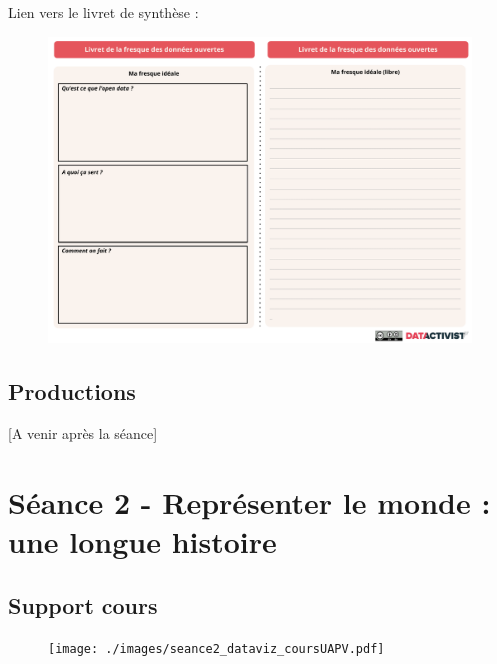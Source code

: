 \documentclass[
  letterpaper,
  DIV=11,
  numbers=noendperiod]{scrreprt}
\begin{document}
Lien vers le livret de synthèse :

\begin{figure}

{\centering \includegraphics{./images/Fresque - livret.pdf}

}

\end{figure}

\hypertarget{productions}{%
\section{Productions}\label{productions}}

{[}A venir après la séance{]}


\hypertarget{suxe9ance-2---repruxe9senter-le-monde-une-longue-histoire}{%
\chapter{Séance 2 - Représenter le monde : une longue
histoire}\label{suxe9ance-2---repruxe9senter-le-monde-une-longue-histoire}}

\hypertarget{support-cours}{%
\section{Support cours}\label{support-cours}}

\begin{figure}

{\centering \texttt{[image: ./images/seance2\_dataviz\_coursUAPV.pdf]}

}

\end{figure}
\end{document}
